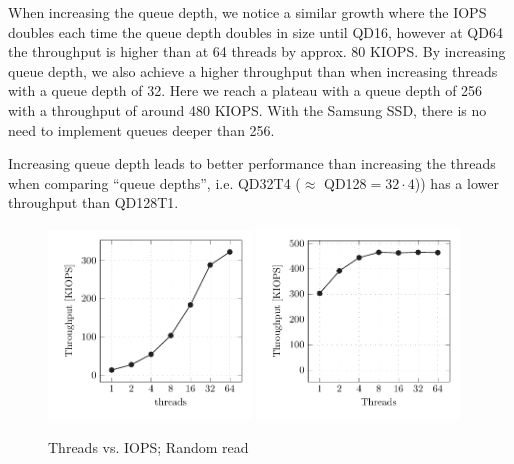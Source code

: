 When increasing the queue depth, we notice a similar growth where the IOPS doubles each time the queue depth doubles in size until QD16, however at QD64 the throughput is higher than at 64 threads by approx. 80 KIOPS. By increasing queue depth, we also achieve a higher throughput than when increasing threads with a queue depth of 32. Here we reach a plateau with a queue depth of 256 with a throughput of around 480 KIOPS. With the Samsung SSD, there is no need to implement queues deeper than 256.

Increasing queue depth leads to better performance than increasing the threads when comparing ``queue depths'', i.e. QD32T4 ($\approx$ QD128$=32 \cdot 4$)) has a lower throughput than QD128T1.

\begin{figure}
  \centering
   {\includegraphics[width=0.48\textwidth]{figures/vroom-iops-thread} \label{fig:vroom-iops-thread-qd1}}
   {\includegraphics[width=0.48\textwidth]{figures/vroom-iops-thread-qd32} \label{fig:vroom-iops-thread-qd32}}
  \caption{Threads vs. IOPS; Random read}
  \label{fig:vroom-iops-thread}
\end{figure}

